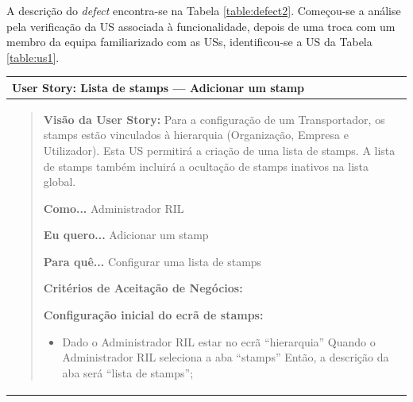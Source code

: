 
                A descrição do \textit{defect} encontra-se na Tabela \ref{table:defect2}. Começou-se a análise pela verificação da US associada à funcionalidade, depois de uma troca com um membro da equipa familiarizado com as USs, identificou-se a US da Tabela \ref{table:us1}.

                \begin{table}[H] %
                    \centering
                    \begin{tabularx}{1\textwidth}{|>{\raggedright\arraybackslash}X|}
                        \hline
                        \rowcolor{lightgray}
                        \textbf{User Story:} Lista de stamps --- Adicionar um stamp \\
                        \hline
                        \rowcolor{lightgray!20}
                      
                        \begin{quote}
                            \textbf{Visão da User Story:} Para a configuração de um Transportador, os stamps estão vinculados à hierarquia (Organização, Empresa e Utilizador). Esta US permitirá a criação de uma lista de stamps. A lista de stamps também incluirá a ocultação de stamps inativos na lista global.
                        
                            \textbf{Como...} Administrador RIL
                        
                            \textbf{Eu quero...} Adicionar um stamp
                        
                            \textbf{Para quê...} Configurar uma lista de stamps
                        
                            \textbf{Critérios de Aceitação de Negócios:}
                        
                            \textbf{Configuração inicial do ecrã de stamps:}

                            \begin{itemize}
                                \item Dado o Administrador RIL estar no ecrã ``hierarquia'' \newline
                                Quando o Administrador RIL seleciona a aba ``stamps'' \newline
                                Então, a descrição da aba será ``lista de stamps'';


\end{itemize}
\end{quote}
\end{tabularx}
\end{table}
